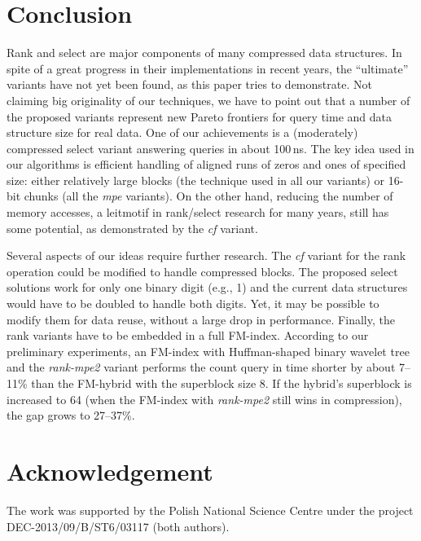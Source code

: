 \documentclass{llncs}
\begin{document}
\section{Conclusion}
\noindent
Rank and select are major components of many compressed data structures.
In spite of a great progress in their implementations in recent years, 
the ``ultimate'' variants have not yet been found, as this paper tries 
to demonstrate.
Not claiming big originality of our techniques, we have to point out 
that a number of the proposed variants represent new Pareto frontiers 
for query time and data structure size for real data.
One of our achievements is a (moderately) compressed select variant 
answering queries in about 100\,ns.
The key idea used in our algorithms is efficient handling of aligned runs 
of zeros and ones of specified size: either relatively large blocks 
(the technique used in all our variants) or 16-bit chunks 
(all the {\em mpe} variants).
On the other hand, reducing the number of memory accesses, 
a leitmotif in rank/select research for many years, 
still has some potential, as demonstrated by the {\em cf} variant.

Several aspects of our ideas require further research. 
The {\em cf} variant for the rank operation could be modified to handle 
compressed blocks.
The proposed select solutions work for only one binary digit (e.g., 1) 
and the current data structures would have to be doubled 
to handle both digits. 
Yet, it may be possible to modify them for data reuse, without a large 
drop in performance.
Finally, the rank variants have to be embedded in a full FM-index.
According to our preliminary experiments, an FM-index with Huffman-shaped
binary wavelet tree and the {\em rank-mpe2} variant performs the 
count query in time shorter by about 7--11\% than the FM-hybrid 
with the superblock size 8.
If the hybrid's superblock is increased to 64 (when the FM-index with {\em rank-mpe2} still wins in compression), the gap grows to 27--37\%.



\section*{Acknowledgement}
\noindent
The work was supported by the 
Polish National Science Centre under the project DEC-2013/09/B/ST6/03117 
(both authors).



\end{document}
